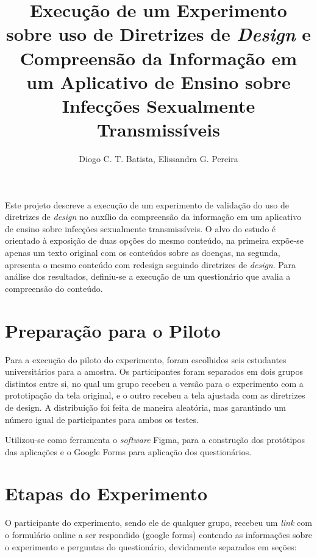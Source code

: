 \documentclass[12pt]{article}
\title{Execução de um Experimento sobre uso de Diretrizes de \textit{Design} e Compreensão da Informação em um Aplicativo de Ensino sobre Infecções Sexualmente Transmissíveis}
\author{Diogo C. T. Batista\inst{1}, Elissandra G. Pereira\inst{1}}
\begin{document}
\maketitle

\begin{resumo}
	Este projeto descreve a execução de um experimento de validação do uso de diretrizes de \textit{design} no auxílio da compreensão da informação em um aplicativo de ensino sobre infecções sexualmente transmissíveis. O alvo do estudo é orientado à exposição de duas opções do mesmo conteúdo, na primeira expõe-se apenas um texto original com os conteúdos sobre as doenças, na segunda, apresenta o mesmo conteúdo com redesign seguindo diretrizes de \textit{design}. Para análise dos resultados, definiu-se a execução de um questionário que avalia a compreensão do conteúdo.
\end{resumo}

\section{Preparação para o Piloto}

Para a execução do piloto do experimento, foram escolhidos seis estudantes universitários para a amostra. Os participantes foram separados em dois grupos distintos entre si, no qual um grupo recebeu a versão para o experimento com a prototipação da tela original, e o outro recebeu a tela ajustada com as diretrizes de design. A distribuição foi feita de maneira aleatória, mas garantindo um número igual de participantes para ambos os testes.

Utilizou-se como ferramenta o \textit{software} Figma, para a construção dos protótipos das aplicações e o Google Forms para aplicação dos questionários.

\section{Etapas do Experimento}
\label{experimento}

O participante do experimento, sendo ele de qualquer grupo, recebeu um \textit{link} com o formulário online a ser respondido (google forms) contendo as informações sobre o experimento e perguntas do questionário, devidamente separados em seções:
\end{document}
